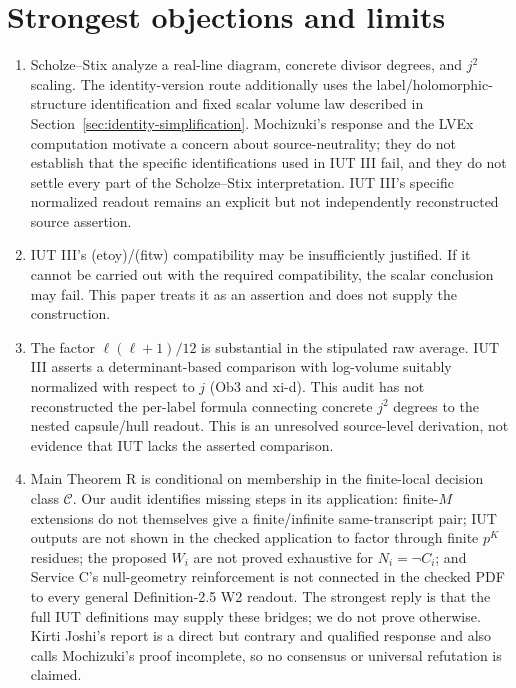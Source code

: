 \documentclass[11pt]{article}
\begin{document}
\section{Strongest objections and limits}
\begin{enumerate}
\item Scholze--Stix analyze a real-line diagram, concrete divisor degrees, and $j^2$ scaling. The identity-version route additionally uses the label/holomorphic-structure identification and fixed scalar volume law described in Section~\ref{sec:identity-simplification}. Mochizuki's response and the LVEx computation motivate a concern about source-neutrality; they do not establish that the specific identifications used in IUT III fail, and they do not settle every part of the Scholze--Stix interpretation. IUT III's specific normalized readout remains an explicit but not independently reconstructed source assertion.
\item IUT III's (etoy)/(fitw) compatibility may be insufficiently justified. If it cannot be carried out with the required compatibility, the scalar conclusion may fail. This paper treats it as an assertion and does not supply the construction.
\item The factor $\ell(\ell+1)/12$ is substantial in the stipulated raw average. IUT III asserts a determinant-based comparison with log-volume suitably normalized with respect to $j$ (Ob3 and xi-d). This audit has not reconstructed the per-label formula connecting concrete $j^2$ degrees to the nested capsule/hull readout. This is an unresolved source-level derivation, not evidence that IUT lacks the asserted comparison.
\item Main Theorem R is conditional on membership in the finite-local decision class $\mathcal C$. Our audit identifies missing steps in its application: finite-$M$ extensions do not themselves give a finite/infinite same-transcript pair; IUT outputs are not shown in the checked application to factor through finite $p^K$ residues; the proposed $W_i$ are not proved exhaustive for $N_i=\neg C_i$; and Service C's null-geometry reinforcement is not connected in the checked PDF to every general Definition-2.5 W2 readout. The strongest reply is that the full IUT definitions may supply these bridges; we do not prove otherwise. Kirti Joshi's report \cite{Joshi} is a direct but contrary and qualified response and also calls Mochizuki's proof incomplete, so no consensus or universal refutation is claimed.
\end{enumerate}
\end{document}
